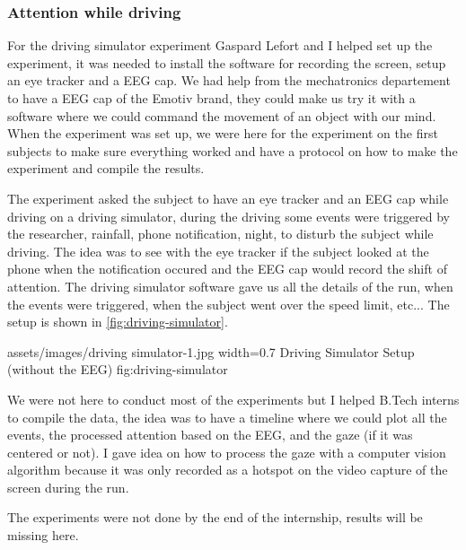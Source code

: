 \subsubsection{Attention while driving}

For the driving simulator experiment Gaspard Lefort and I helped set up the
experiment, it was needed to install the software for recording the screen,
setup an eye tracker and a EEG cap. We had help from the mechatronics
departement to have a EEG cap of the Emotiv brand, they could make us try it
with a software where we could command the movement of an object with our mind.
When the experiment was set up, we were here for the experiment on the first
subjects to make sure everything worked and have a protocol on how to make the
experiment and compile the results.

The experiment asked the subject to have an eye tracker and an EEG cap while
driving on a driving simulator, during the driving some events were triggered by
the researcher, rainfall, phone notification, night, to disturb the subject
while driving. The idea was to see with the eye tracker if the subject looked at
the phone when the notification occured and the EEG cap would record the shift
of attention. The driving simulator software gave us all the details of the run,
when the events were triggered, when the subject went over the speed limit,
etc... The setup is shown in \cref{fig:driving-simulator}.

\insertfigure
    {assets/images/driving simulator-1.jpg}
    {width=0.7\textwidth}
    {Driving Simulator Setup (without the EEG)}
    {fig:driving-simulator}

We were not here to conduct most of the experiments but I helped B.Tech interns
to compile the data, the idea was to have a timeline where we could plot all the
events, the processed attention based on the EEG, and the gaze (if it was
centered or not). I gave idea on how to process the gaze with a computer vision
algorithm because it was only recorded as a hotspot on the video capture of the
screen during the run.

The experiments were not done by the end of the internship, results will be
missing here.
